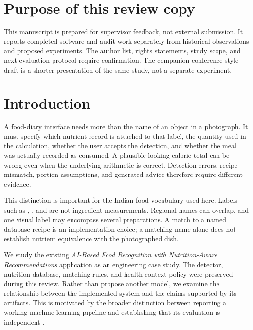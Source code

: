 \documentclass[12pt,journal,draftclsnofoot,onecolumn]{IEEEtran}
\newcommand{\code}[1]{\texttt{\detokenize{#1}}}
\begin{document}
\section*{Purpose of this review copy}
This manuscript is prepared for supervisor feedback, not external submission. It reports completed software and audit work separately from historical observations and proposed experiments. The author list, rights statements, study scope, and next evaluation protocol require confirmation. The companion conference-style draft is a shorter presentation of the same study, not a separate experiment.
\linenumbers
\modulolinenumbers[5]

\section{Introduction}
A food-diary interface needs more than the name of an object in a photograph. It must specify which nutrient record is attached to that label, the quantity used in the calculation, whether the user accepts the detection, and whether the meal was actually recorded as consumed. A plausible-looking calorie total can be wrong even when the underlying arithmetic is correct. Detection errors, recipe mismatch, portion assumptions, and generated advice therefore require different evidence.

This distinction is important for the Indian-food vocabulary used here. Labels such as \code{rice}, \code{palak_paneer}, and \code{chicken_biryani} are not ingredient measurements. Regional names can overlap, and one visual label may encompass several preparations. A match to a named database recipe is an implementation choice; a matching name alone does not establish nutrient equivalence with the photographed dish.

We study the existing \emph{AI-Based Food Recognition with Nutrition-Aware Recommendations} application as an engineering case study. The detector, nutrition database, matching rules, and health-context policy were preserved during this review. Rather than propose another model, we examine the relationship between the implemented system and the claims supported by its artifacts. This is motivated by the broader distinction between reporting a working machine-learning pipeline and establishing that its evaluation is independent \cite{kapoor2023leakage}.
\end{document}
